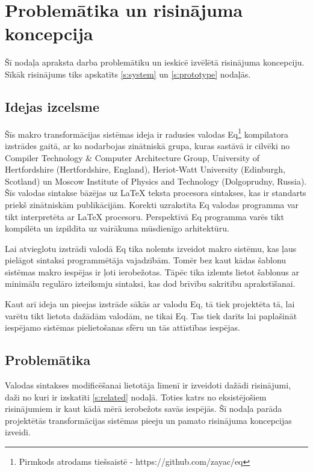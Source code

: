 \section{Problemātika un risinājuma koncepcija}
\label{s:motivation}

Šī nodaļa apraksta darba problemātiku un ieskicē izvēlētā risinājuma koncepciju. Sīkāk risinājums tiks apskatīts \ref{s:system} un \ref{s:prototype} nodaļās.

\subsection{Idejas izcelsme}

Šīs makro transformācijas sistēmas ideja ir radusies valodas Eq\footnote{Pirmkods atrodams tiešsaistē - https://github.com/zayac/eq} kompilatora izstrādes gaitā, ar ko nodarbojas zinātniskā grupa, kuras sastāvā ir cilvēki no Compiler Technology \& Computer Architecture Group, University of Hertfordshire (Hertfordshire, England), Heriot-Watt University (Edinburgh, Scotland) un Moscow Institute of Physics and Technology (Dolgoprudny, Russia). Šīs valodas sintakse bāzējas uz \LaTeX{} teksta procesora sintakses, kas ir standarts priekš zinātniskām publikācijām. Korekti uzrakstīta Eq valodas programma var tikt interpretēta ar \LaTeX{} procesoru. Perspektīvā Eq programma varēs tikt kompilēta un izpildīta uz vairākuma mūsdienīgo arhitektūru. 

Lai atvieglotu izstrādi valodā Eq tika nolemts izveidot makro sistēmu, kas ļaus pielāgot sintaksi programmētāja vajadzībām. Tomēr bez kaut kādas šablonu sistēmas makro iespējas ir ļoti ierobežotas. Tāpēc tika izlemts lietot šablonus ar minimālu regulāro izteiksmju sintaksi, kas dod brīvību sakritību aprakstīšanai. 

Kaut arī ideja un pieejas izstrāde sākās ar valodu Eq, tā tiek projektēta tā, lai varētu tikt lietota dažādām valodām, ne tikai Eq. Tas tiek darīts lai paplašināt iespējamo sistēmas pielietošanas sfēru un tās attīstības iespējas.

\subsection{Problemātika}

Valodas sintakses modificēšanai lietotāja līmenī ir izveidoti dažādi risinājumi, daži no kuri ir izskatīti \ref{s:related} nodaļā. Toties katrs no eksistējošiem risinājumiem ir kaut kādā mērā ierobežots savās iespējās. Šī nodaļa parāda projektētās transformācijas sistēmas pieeju un pamato risinājuma koncepcijas izveidi.

